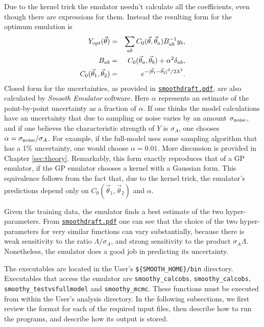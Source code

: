 \documentclass[UserManual.tex]{subfiles}
\begin{document}
\begin{sloppypar}
Due to the kernel trick the emulator needn't calculate all the coefficients, even though there are expressions for them. Instead the resulting form for the optimum emulation is
\begin{eqnarray}
Y_{\rm opt}(\vec{\theta})&=&\sum_{ab}C_0(\vec{\theta},\vec{\theta}_a)B^{-1}_{ab}y_b,\\
\nonumber
B_{ab}&=&C_0(\vec{\theta}_a,\vec{\theta}_b)+\alpha^2\delta_{ab},\\
\nonumber
C_0(\vec{\theta}_1,\vec{\theta}_2)&=&e^{-|\vec{\theta}_1-\vec{\theta}_2|^2/2\Lambda^2}.
\end{eqnarray}
Closed form for the uncertainties, as provided in \href{./smoothdraft.pdf}{{\tt smoothdraft.pdf}}, are also calculated by {\it Smooth Emulator} software. Here $\alpha$ represents an estimate of the point-by-point uncertainty as a fraction of $\alpha$. If one thinks the model calculations have an uncertainty that due to sampling or noise varies by an amount $\sigma_{\rm noise}$, and if one believes the characteristic strength of $Y$ is $\sigma_A$, one chooses $\alpha=\sigma_{\rm noise}/\sigma_A$. For example, if the full-model uses some sampling algorithm that has a 1\% uncertainty, one would choose $\alpha=0.01$. More discussion is provided in Chapter \ref{sec:theory}. Remarkably, this form exactly reproduces that of a GP emulator, if the GP emulator chooses a kernel with a Gaussian form. This equivalence follows from the fact that, due to the kernel trick, the emulator's predictions depend only on $C_0(\vec{\theta}_1,\vec{\theta}_2)$ and $\alpha$.

Given the training data, the emulator finds a best estimate of the two hyper-parameters. From \href{./smoothdraft.pdf}{{\tt smoothdraft.pdf}} one can see that the choice of the two hyper-parameters for very similar functions can vary substantially, because there is weak sensitivity to the ratio $\Lambda/\sigma_A$, and strong sensitivity to the product $\sigma_A\Lambda$. Nonetheless, the emulator does a good job in predicting its uncertainty.

The executables are located in the User's {\tt \$\{SMOOTH\_HOME\}/bin} directory. Executables that access the emulator are {\tt smoothy\_calcobs}, {\tt smoothy\_calcobs}, {\tt smoothy\_testvsfullmodel} and {\tt smoothy\_mcmc}. These functions must be executed from within the User's analysis directory. In the following subsections, we first review the format for each of the required input files, then describe how to run the programs, and describe how its output is stored.


\end{sloppypar}
\end{document}
